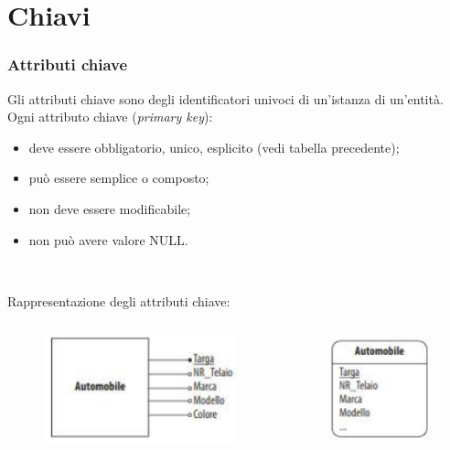 \documentclass[]{beamer}
\begin{document}
\section{Chiavi}


\begin{frame}
\frametitle{Attributi chiave}
Gli attributi chiave sono degli \alert<1>{identificatori univoci} di un'istanza di un'entità. Ogni attributo chiave (\emph{primary key}):
\begin{itemize}
  \item deve essere obbligatorio, unico, esplicito (vedi tabella precedente);\pause
  \item può essere semplice o composto;\pause
  \item non deve essere modificabile;\pause
  \item non può avere valore NULL.\pause
\end{itemize}

~

Rappresentazione degli attributi chiave:
\begin{columns}
\begin{column}{.4\textwidth}
  \begin{figure}
    \includegraphics[width=.8\columnwidth]{img/chiavestd.png}
  \end{figure}
\end{column}
\begin{column}{.4\textwidth}
  \begin{figure}
    \includegraphics[width=.5\columnwidth]{img/chiaveuml.png}
  \end{figure}
\end{column}
\end{columns}
\end{frame}
\end{document}
